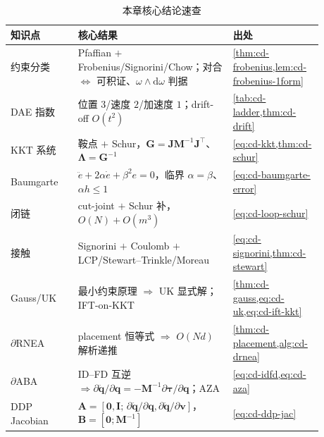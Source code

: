 \begin{table}[H]\centering\small
\caption{本章核心结论速查}
\label{tab:cd-summary}
\begin{tabular}{p{0.20\linewidth}p{0.46\linewidth}p{0.22\linewidth}}
\toprule
知识点 & 核心结果 & 出处 \\
\midrule
约束分类 & Pfaffian $+$ Frobenius/Signorini/Chow；对合 $\Leftrightarrow$ 可积证、$\omega\wedge\mathrm d\omega$ 判据 & \cref{thm:cd-frobenius,lem:cd-frobenius-1form} \\
DAE 指数 & 位置 $3$/速度 $2$/加速度 $1$；drift-off $O(t^2)$ & \cref{tab:cd-ladder,thm:cd-drift} \\
KKT 系统 & 鞍点 $+$ Schur，$\mathbf G=\mathbf J\mathbf M^{-1}\mathbf J^\top$、$\boldsymbol\Lambda=\mathbf G^{-1}$ & \cref{eq:cd-kkt,thm:cd-schur} \\
Baumgarte & $\ddot e+2\alpha\dot e+\beta^2 e=0$，临界 $\alpha=\beta$、$\alpha h\le1$ & \cref{eq:cd-baumgarte-error} \\
闭链 & cut-joint $+$ Schur 补，$O(N)+O(m^3)$ & \cref{eq:cd-loop-schur} \\
接触 & Signorini $+$ Coulomb $+$ LCP/Stewart--Trinkle/Moreau & \cref{eq:cd-signorini,thm:cd-stewart} \\
Gauss/UK & 最小约束原理 $\Rightarrow$ UK 显式解；IFT-on-KKT & \cref{thm:cd-gauss,eq:cd-uk,eq:cd-ift-kkt} \\
$\partial$RNEA & placement 恒等式 $\Rightarrow$ $O(Nd)$ 解析递推 & \cref{thm:cd-placement,alg:cd-drnea} \\
$\partial$ABA & ID--FD 互逆 $\Rightarrow\partial\ddot{\mathbf q}/\partial\mathbf q=-\mathbf M^{-1}\partial\boldsymbol\tau/\partial\mathbf q$；AZA & \cref{eq:cd-idfd,eq:cd-aza} \\
DDP Jacobian & $\mathbf A=[\mathbf 0,\mathbf I;\,\partial\ddot{\mathbf q}/\partial\mathbf q,\partial\ddot{\mathbf q}/\partial\mathbf v]$，$\mathbf B=[\mathbf 0;\mathbf M^{-1}]$ & \cref{eq:cd-ddp-jac} \\
\bottomrule
\end{tabular}
\end{table}

